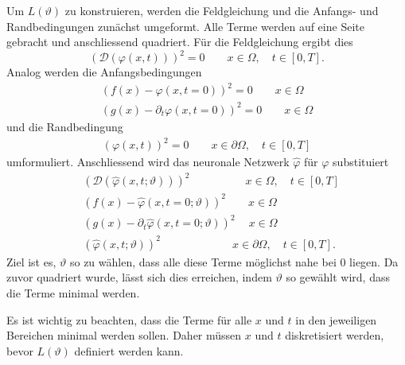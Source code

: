 Um \( L(\vartheta) \) zu konstruieren, werden die Feldgleichung und die Anfangs- und Randbedingungen zunächst umgeformt.
Alle Terme werden auf eine Seite gebracht und anschliessend quadriert.
Für die Feldgleichung ergibt dies
\begin{equation}
    \left(\mathcal{D}(\varphi(x, t))\right)^2 = 0 \qquad x \in \Omega, \quad t \in [0,T].
    \label{neuronal:feldgleichung_umformuliert}
\end{equation}
Analog werden die Anfangsbedingungen
\begin{equation}
    \begin{aligned}
        \left(f(x) - \varphi(x, t = 0)\right)^2 = 0 \qquad x \in \Omega\\
        \left(g(x) - \partial_t \varphi(x, t = 0)\right)^2 = 0 \qquad x \in \Omega
    \end{aligned}
    \label{neuronal:anfangsbedingung_umformuliert}
\end{equation}
und die Randbedingung
\begin{equation}
    \begin{aligned}
        \left(\varphi(x, t)\right)^2 = 0 \qquad x \in \partial \Omega, \quad t \in [0,T]
    \end{aligned}
    \label{neuronal:randbedingung_umformuliert}
\end{equation}
umformuliert.
Anschliessend wird das neuronale Netzwerk $\hat{\varphi}$ für $\varphi$ substituiert
\begin{equation}
    \begin{aligned}
        &\left(\mathcal{D}(\hat{\varphi}(x, t; \vartheta))\right)^2 \qquad \qquad \quad x \in \Omega, \quad t \in [0,T]\\
        &\left(f(x) - \hat{\varphi}(x, t = 0; \vartheta)\right)^2 \qquad x \in \Omega\\
        &\left(g(x) - \partial_t \hat{\varphi}(x, t = 0; \vartheta)\right)^2 \quad \: x \in \Omega\\
        &\left(\hat{\varphi}(x, t; \vartheta)\right)^2 \qquad \qquad \qquad \: \: x \in \partial \Omega, \quad t \in [0,T].
    \end{aligned}
    \label{neuronal:umformuliert_nn}
\end{equation}
Ziel ist es, $\vartheta$ so zu wählen, dass alle diese Terme möglichst nahe bei 0 liegen.
Da zuvor quadriert wurde, lässt sich dies erreichen, indem $\vartheta$ so gewählt wird, dass die Terme minimal werden.

Es ist wichtig zu beachten, dass die Terme für alle $x$ und $t$ in den jeweiligen Bereichen minimal werden sollen.
Daher müssen $x$ und $t$ diskretisiert werden, bevor $L(\vartheta)$ definiert werden kann.

